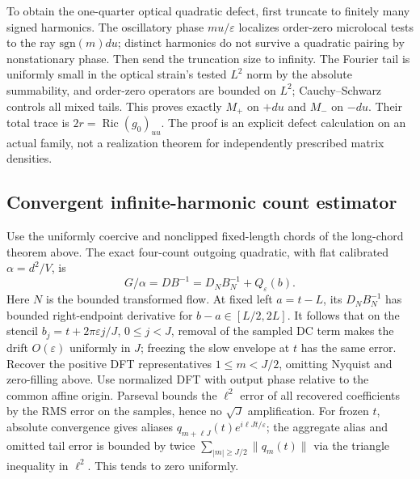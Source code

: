 \documentclass[11pt]{article}
\begin{document}
To obtain the one-quarter optical quadratic defect, first truncate to finitely many signed harmonics. The oscillatory phase \(m u/\varepsilon\) localizes order-zero microlocal tests to the ray \(\mathrm{sgn}(m)du\); distinct harmonics do not survive a quadratic pairing by nonstationary phase. Then send the truncation size to infinity. The Fourier tail is uniformly small in the optical strain's tested \(L^2\) norm by the absolute summability, and order-zero operators are bounded on \(L^2\); Cauchy--Schwarz controls all mixed tails. This proves exactly \(M_+\) on \(+du\) and \(M_-\) on \(-du\). Their total trace is \(2r=\operatorname{Ric}(g_0)_{uu}\). The proof is an explicit defect calculation on an actual family, not a realization theorem for independently prescribed matrix densities.

\subsection{Convergent infinite-harmonic count estimator}\label{convergent-infinite-harmonic-count-estimator}

Use the uniformly coercive and nonclipped fixed-length chords of the long-chord theorem above. The exact four-count outgoing quadratic, with flat calibrated \(\alpha=d^2/V\), is
\[
G/\alpha=DB^{-1}=D_NB_N^{-1}+Q_\varepsilon(b).
\]
Here \(N\) is the bounded transformed flow. At fixed left \(a=t-L\), its \(D_NB_N^{-1}\) has bounded right-endpoint derivative for \(b-a\in[L/2,2L]\). It follows that on the stencil \(b_j=t+2\pi\varepsilon j/J\), \(0\le j<J\), removal of the sampled DC term makes the drift \(O(\varepsilon)\) uniformly in \(J\); freezing the slow envelope at \(t\) has the same error. Recover the positive DFT representatives \(1\le m<J/2\), omitting Nyquist and zero-filling above. Use normalized DFT with output phase relative to the common affine origin. Parseval bounds the \(\ell^2\) error of all recovered coefficients by the RMS error on the samples, hence no \(\sqrt J\) amplification. For frozen \(t\), absolute convergence gives aliases \(q_{m+\ell J}(t)e^{i\ell Jt/\varepsilon}\); the aggregate alias and omitted tail error is bounded by twice \(\sum_{|m|\ge J/2}\|q_m(t)\|\) via the triangle inequality in \(\ell^2\). This tends to zero uniformly.
\end{document}
